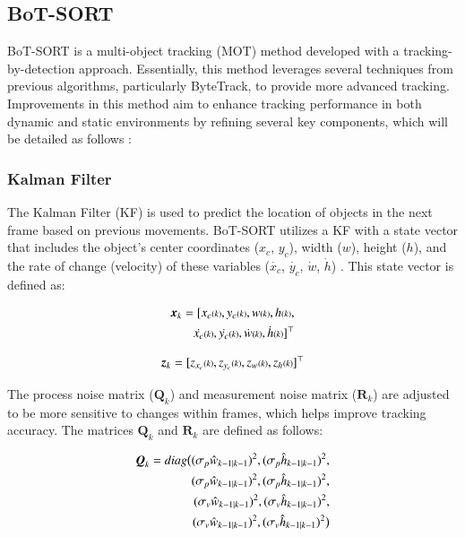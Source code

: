 \subsection{BoT-SORT}

BoT-SORT is a multi-object tracking (MOT) method developed with a tracking-by-detection approach. Essentially, this method leverages several techniques from previous algorithms, particularly ByteTrack, to provide more advanced tracking. Improvements in this method aim to enhance tracking performance in both dynamic and static environments by refining several key components, which will be detailed as follows \cite{aharon2022botsortrobustassociationsmultipedestrian}:

\subsubsection{Kalman Filter}
\label{subsubsec:Kalman Filter}

The Kalman Filter (KF) is used to predict the location of objects in the next frame based on previous movements. BoT-SORT utilizes a KF with a state vector that includes the object's center coordinates ($x_c$, $y_c$), width ($w$), height ($h$), and the rate of change (velocity) of these variables ($\dot{x_c}$, $\dot{y_c}$, $\dot{w}$, $\dot{h}$) \cite{bewley2016simple, wojke2017simple}. This state vector is defined as:

\begin{equation}
  \begin{split}
    \vb*{x}_k = [x_{c}{\scriptstyle(k)}, y_{c}{\scriptstyle(k)}, w{\scriptstyle(k)}, h{\scriptstyle(k)}, \\        
    \dot{x_{c}}{\scriptstyle(k)}, \dot{y_{c}}{\scriptstyle(k)}, \dot{w}{\scriptstyle(k)}, \dot{h}{\scriptstyle(k)}]^\top
  \end{split}
\end{equation}

\begin{equation}
  \vb*{z}_k = [z_{x_c}{\scriptstyle(k)}, z_{y_c}{\scriptstyle(k)}, z_{w}{\scriptstyle(k)}, z_{h}{\scriptstyle(k)}]^\top
\end{equation}

The process noise matrix ($\mathbf{Q}_k$) and measurement noise matrix ($\mathbf{R}_k$) are adjusted to be more sensitive to changes within frames, which helps improve tracking accuracy. The matrices $\mathbf{Q}_k$ and $\mathbf{R}_k$ are defined as follows:

\begin{equation}
  \begin{split}
    \vb*{Q}_k = diag\big{(} (\sigma_{p} \hat{w}_{k-1|k-1})^2, (\sigma_{p} \hat{h}_{k-1|k-1})^2, \\
    (\sigma_{p} \hat{w}_{k-1|k-1})^2, (\sigma_{p} \hat{h}_{k-1|k-1})^2, \\
    (\sigma_{v} \hat{w}_{k-1|k-1})^2, (\sigma_{v} \hat{h}_{k-1|k-1})^2, \\ 
    (\sigma_{v} \hat{w}_{k-1|k-1})^2 ,(\sigma_{v} \hat{h}_{k-1|k-1})^2\big{)}
  \end{split}
\end{equation}

